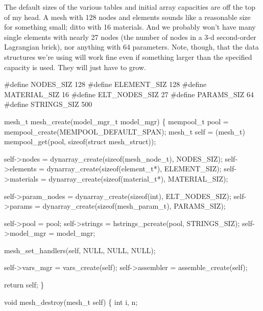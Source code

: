 The default sizes of the various tables and initial array capacities
are off the top of my head.  A mesh with 128 nodes and elements sounds
like a reasonable size for something small; ditto with 16 materials.
And we probably won't have many single elements with nearly 27 %
nodes (the number of nodes in a 3-d second-order Lagrangian brick),
nor anything with 64 parameters.  Note, though, that the data structures
we're using will work fine even if something larger than the specified %
capacity is used.  They will just have to grow.

\nwenddocs{}\endmoddef
#define NODES_SIZ      128
#define ELEMENT_SIZ    128
#define MATERIAL_SIZ   16
#define ELT_NODES_SIZ  27
#define PARAMS_SIZ     64
#define STRINGS_SIZ    500

\nwendcode{}\nwdocspar

\nwenddocs{}\plusendmoddef
mesh_t mesh_create(model_mgr_t model_mgr)
\{
    mempool_t pool = mempool_create(MEMPOOL_DEFAULT_SPAN);
    mesh_t    self = (mesh_t) mempool_get(pool, sizeof(struct mesh_struct));

    self->nodes     = dynarray_create(sizeof(mesh_node_t), NODES_SIZ);
    self->elements  = dynarray_create(sizeof(element_t*),  ELEMENT_SIZ);
    self->materials = dynarray_create(sizeof(material_t*), MATERIAL_SIZ);

    self->param_nodes = dynarray_create(sizeof(int), ELT_NODES_SIZ);
    self->params = dynarray_create(sizeof(mesh_param_t), PARAMS_SIZ);

    self->pool      = pool;
    self->strings   = hstrings_pcreate(pool, STRINGS_SIZ);
    self->model_mgr = model_mgr;

    mesh_set_handlers(self, NULL, NULL, NULL);

    self->vars_mgr  = vars_create(self);
    self->assembler = assemble_create(self);

    return self;
\}

\nwendcode{}\nwdocspar

\nwenddocs{}\plusendmoddef
void mesh_destroy(mesh_t self)
\{
    int i, n;

